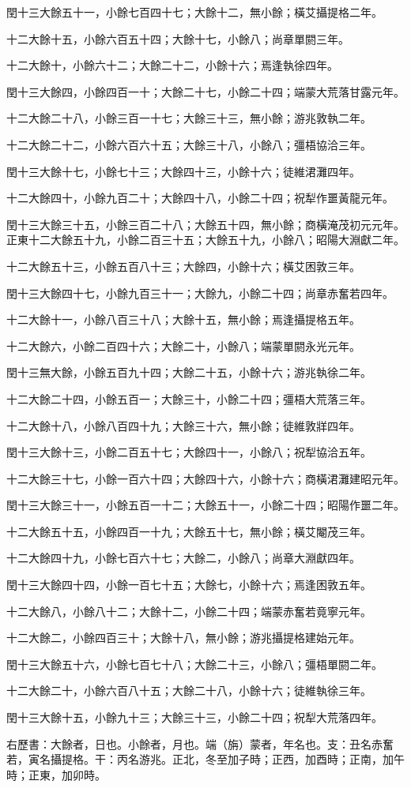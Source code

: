 \begin{pinyinscope}
閏十三大餘五十一，小餘七百四十七；大餘十二，無小餘；橫艾攝提格二年。

十二大餘十五，小餘六百五十四；大餘十七，小餘八；尚章單閼三年。

十二大餘十，小餘六十二；大餘二十二，小餘十六；焉逢執徐四年。

閏十三大餘四，小餘四百一十；大餘二十七，小餘二十四；端蒙大荒落甘露元年。

十二大餘二十八，小餘三百一十七；大餘三十三，無小餘；游兆敦執二年。

十二大餘二十二，小餘六百六十五；大餘三十八，小餘八；彊梧協洽三年。

閏十三大餘十七，小餘七十三；大餘四十三，小餘十六；徒維涒灘四年。

十二大餘四十，小餘九百二十；大餘四十八，小餘二十四；祝犁作噩黃龍元年。

閏十三大餘三十五，小餘三百二十八；大餘五十四，無小餘；商橫淹茂初元元年。正東十二大餘五十九，小餘二百三十五；大餘五十九，小餘八；昭陽大淵獻二年。

十二大餘五十三，小餘五百八十三；大餘四，小餘十六；橫艾困敦三年。

閏十三大餘四十七，小餘九百三十一；大餘九，小餘二十四；尚章赤奮若四年。

十二大餘十一，小餘八百三十八；大餘十五，無小餘；焉逢攝提格五年。

十二大餘六，小餘二百四十六；大餘二十，小餘八；端蒙單閼永光元年。

閏十三無大餘，小餘五百九十四；大餘二十五，小餘十六；游兆執徐二年。

十二大餘二十四，小餘五百一；大餘三十，小餘二十四；彊梧大荒落三年。

十二大餘十八，小餘八百四十九；大餘三十六，無小餘；徒維敦牂四年。

閏十三大餘十三，小餘二百五十七；大餘四十一，小餘八；祝犁協洽五年。

十二大餘三十七，小餘一百六十四；大餘四十六，小餘十六；商橫涒灘建昭元年。

閏十三大餘三十一，小餘五百一十二；大餘五十一，小餘二十四；昭陽作噩二年。

十二大餘五十五，小餘四百一十九；大餘五十七，無小餘；橫艾閹茂三年。

十二大餘四十九，小餘七百六十七；大餘二，小餘八；尚章大淵獻四年。

閏十三大餘四十四，小餘一百七十五；大餘七，小餘十六；焉逢困敦五年。

十二大餘八，小餘八十二；大餘十二，小餘二十四；端蒙赤奮若竟寧元年。

十二大餘二，小餘四百三十；大餘十八，無小餘；游兆攝提格建始元年。

閏十三大餘五十六，小餘七百七十八；大餘二十三，小餘八；彊梧單閼二年。

十二大餘二十，小餘六百八十五；大餘二十八，小餘十六；徒維執徐三年。

閏十三大餘十五，小餘九十三；大餘三十三，小餘二十四；祝犁大荒落四年。

右歷書：大餘者，日也。小餘者，月也。端（旃）蒙者，年名也。支：丑名赤奮若，寅名攝提格。干：丙名游兆。正北，冬至加子時；正西，加酉時；正南，加午時；正東，加卯時。


\end{pinyinscope}